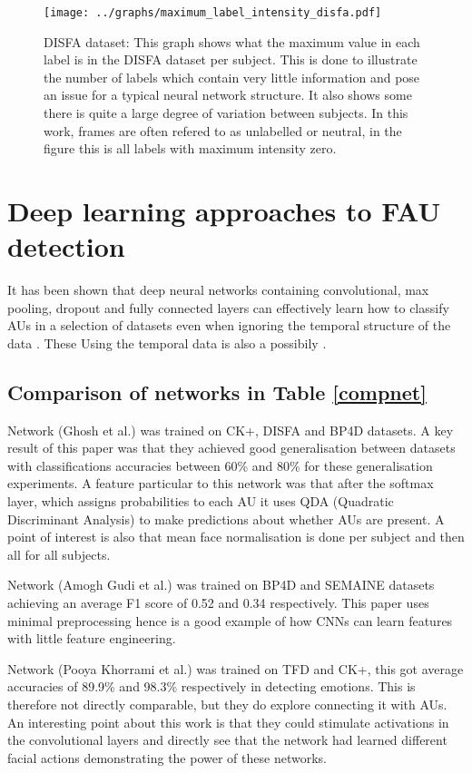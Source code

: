 \begin{figure}[h!]
  \texttt{[image: ../graphs/maximum\_label\_intensity\_disfa.pdf]}
  \caption{DISFA dataset: This graph shows what the maximum value in each label is in the DISFA dataset per subject. This
  is done to illustrate the number of labels which contain very little information
  and pose an issue for a typical neural network structure. It also shows some there
  is quite a large degree of variation between subjects. In this work, frames are often refered to as unlabelled or neutral,
  in the figure this is all labels with maximum intensity zero.}\label{disfastats}
\end{figure}
\newpage

\section{Deep learning approaches to FAU detection}
It has been shown that deep neural networks containing convolutional, max pooling,
dropout and fully connected layers can effectively learn how to classify AUs in
a selection of datasets even when ignoring the temporal structure of the data \cite{Gudi2015,Ghosh2015,dodeeplearn}. These
Using the temporal data is also a possibily \cite{emonet,Jaiswal2016}.
%
%
%
\subsection*{Comparison of networks in Table \ref{compnet}}
Network \cite{Ghosh2015} (Ghosh et al.) was trained on CK+, DISFA and BP4D datasets.
A key result of this paper was that they achieved good generalisation between datasets
with classifications accuracies between 60\% and 80\% for these generalisation experiments.
A feature particular to this network was that after the softmax layer, which assigns probabilities
to each AU it uses QDA (Quadratic Discriminant Analysis\cite{precogbook})  to
make predictions about whether AUs are present. A point of interest is also that
mean face normalisation is done per subject and then all for all subjects.

Network \cite{Gudi2015} (Amogh Gudi et al.) was trained on BP4D and SEMAINE
datasets achieving an average F1 score of 0.52 and 0.34 respectively. This paper
uses minimal preprocessing hence is a good example of how CNNs can learn features
with little feature engineering.

Network \cite{dodeeplearn} (Pooya Khorrami et al.) was trained on TFD and CK+,
this got average accuracies of 89.9\% and 98.3\% respectively in detecting emotions. This
is therefore not directly comparable, but they do explore connecting it with AUs.
An interesting point about this work is that they could stimulate activations in the convolutional
layers and directly see that the network had learned different facial actions demonstrating the
power of these networks.

